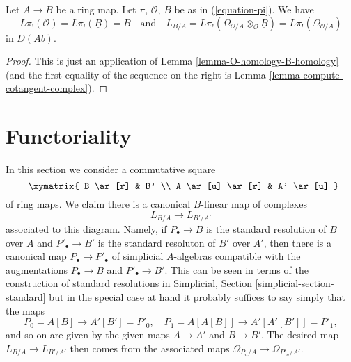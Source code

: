 \begin{lemma}
\label{lemma-apply-O-B-comparison}
Let $A \to B$ be a ring map. Let $\pi$, $\mathcal{O}$, $\underline{B}$
be as in (\ref{equation-pi}). We have
$$
L\pi_!(\mathcal{O}) = L\pi_!(\underline{B}) = B
\quad\text{and}\quad
L_{B/A} = L\pi_!(\Omega_{\mathcal{O}/A} \otimes_\mathcal{O} \underline{B}) =
L\pi_!(\Omega_{\mathcal{O}/A})
$$
in $D(\textit{Ab})$.
\end{lemma}

\begin{proof}
This is just an application of Lemma \ref{lemma-O-homology-B-homology}
(and the first equality of the sequence on the right is
Lemma \ref{lemma-compute-cotangent-complex}).
\end{proof}








\section{Functoriality}
\label{section-functoriality}

\noindent
In this section we consider a commutative square
\begin{equation}
\label{equation-commutative-square}
\vcenter{
\xymatrix{
B \ar[r] & B' \\
A \ar[u] \ar[r] & A' \ar[u]
}
}
\end{equation}
of ring maps. We claim there is a canonical $B$-linear map of complexes
$$
L_{B/A} \longrightarrow L_{B'/A'}
$$
associated to this diagram. Namely, if $P_\bullet \to B$ is the
standard resolution of $B$ over $A$ and $P'_\bullet \to B'$ is the
standard resoluton of $B'$ over $A'$, then there is a canonical map
$P_\bullet \to P'_\bullet$
of simplicial $A$-algebras compatible with the augmentations
$P_\bullet \to B$ and $P'_\bullet \to B'$. This can be seen in terms
of the construction of standard resolutions in
Simplicial, Section \ref{simplicial-section-standard}
but in the special case at hand it probably suffices to say simply
that the maps
$$
P_0 = A[B] \longrightarrow A'[B'] = P'_0,\quad
P_1 = A[A[B]] \longrightarrow A'[A'[B']] = P'_1,
$$
and so on are given by the given maps $A \to A'$ and $B \to B'$.
The desired map $L_{B/A} \to L_{B'/A'}$ then comes from the associated
maps $\Omega_{P_n/A} \to \Omega_{P'_n/A'}$.

